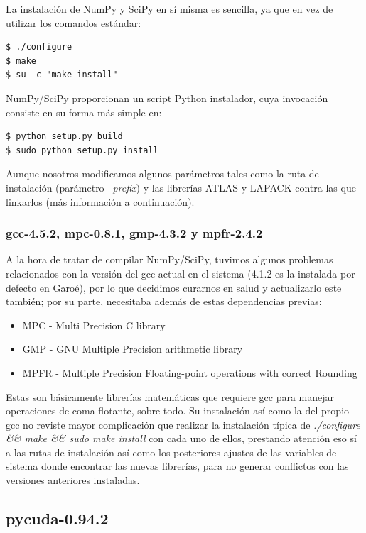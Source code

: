 \documentclass[twoside]{article}
\begin{document}
La instalación de NumPy y SciPy en sí misma es sencilla, ya que en vez de utilizar los comandos estándar:

\begin{verbatim}
$ ./configure
$ make
$ su -c "make install"
\end{verbatim}

NumPy/SciPy proporcionan un script Python instalador, cuya invocación consiste en su forma más simple en:

\begin{verbatim}
$ python setup.py build
$ sudo python setup.py install
\end{verbatim}

Aunque nosotros modificamos algunos parámetros tales como la ruta de instalación (parámetro \emph{--prefix}) y las librerías ATLAS y LAPACK contra las que linkarlos (más información a continuación).

\subsubsection{gcc-4.5.2, mpc-0.8.1, gmp-4.3.2 y mpfr-2.4.2}

A la hora de tratar de compilar NumPy/SciPy, tuvimos algunos problemas relacionados con la versión del gcc actual en el sistema (4.1.2 es la instalada por defecto en Garoé), por lo que decidimos curarnos en salud y actualizarlo este también; por su parte, necesitaba además de estas dependencias previas:

\begin{itemize}
   \item MPC - Multi Precision C library
   \item GMP - GNU Multiple Precision arithmetic library
   \item MPFR - Multiple Precision Floating-point operations with correct Rounding
\end{itemize}

Estas son básicamente librerías matemáticas que requiere gcc para manejar operaciones de coma flotante, sobre todo. Su instalación así como la del propio gcc no reviste mayor complicación que realizar la instalación típica de \emph{./configure \&\& make \&\& sudo make install} con cada uno de ellos, prestando atención eso sí a las rutas de instalación así como los posteriores ajustes de las variables de sistema donde encontrar las nuevas librerías, para no generar conflictos con las versiones anteriores instaladas.

\subsection{pycuda-0.94.2}
\end{document}
